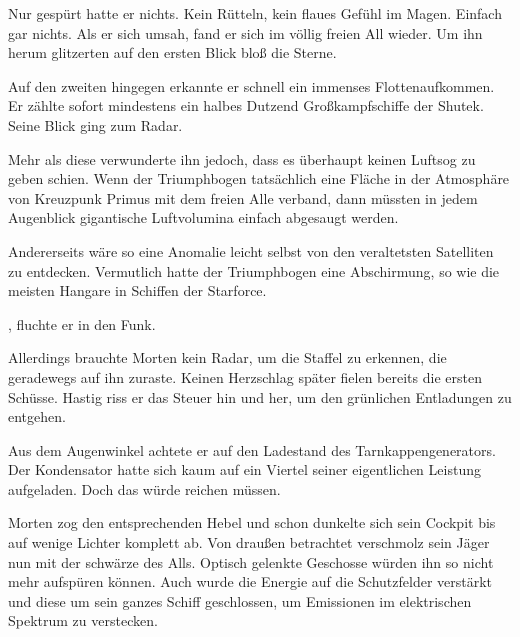 \par

Nur gespürt hatte er nichts. Kein Rütteln, kein flaues Gefühl im Magen. Einfach gar nichts. Als er sich umsah, fand er sich im völlig freien All wieder. Um ihn herum glitzerten auf den ersten Blick bloß die Sterne.

\par

Auf den zweiten hingegen erkannte er schnell ein immenses Flottenaufkommen. Er zählte sofort mindestens ein halbes Dutzend Großkampfschiffe der Shutek. Seine Blick ging zum Radar.

\par

Mehr als diese verwunderte ihn jedoch, dass es überhaupt keinen Luftsog zu geben schien. Wenn der Triumphbogen tatsächlich eine Fläche in der Atmosphäre von Kreuzpunk Primus mit dem freien Alle verband, dann müssten in jedem Augenblick gigantische Luftvolumina einfach abgesaugt werden.

\par

Andererseits wäre so eine Anomalie leicht selbst von den veraltetsten Satelliten zu entdecken. Vermutlich hatte der Triumphbogen eine Abschirmung, so wie die meisten Hangare in Schiffen der Starforce.

\par

, fluchte er in den Funk. 

\par

Allerdings brauchte Morten kein Radar, um die Staffel zu erkennen, die geradewegs auf ihn zuraste. Keinen Herzschlag später fielen bereits die ersten Schüsse. Hastig riss er das Steuer hin und her, um den grünlichen Entladungen zu entgehen.

\par

Aus dem Augenwinkel achtete er auf den Ladestand des Tarnkappengenerators. Der Kondensator hatte sich kaum auf ein Viertel seiner eigentlichen Leistung aufgeladen. Doch das würde reichen müssen.

\par

Morten zog den entsprechenden Hebel und schon dunkelte sich sein Cockpit bis auf wenige Lichter komplett ab. Von draußen betrachtet verschmolz sein Jäger nun mit der schwärze des Alls. Optisch gelenkte Geschosse würden ihn so nicht mehr aufspüren können. Auch wurde die Energie auf die Schutzfelder verstärkt und diese um sein ganzes Schiff geschlossen, um Emissionen im elektrischen Spektrum zu verstecken.

